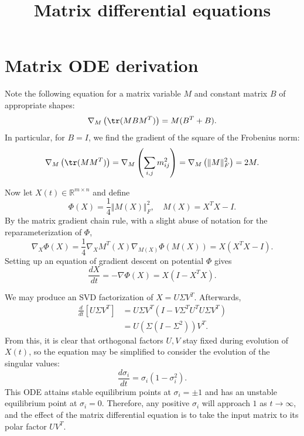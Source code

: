 \documentclass[12pt]{article}
\title{Matrix differential equations}
\begin{document}
\maketitle
\appendix

\section{Matrix ODE derivation}
Note the following equation for a matrix variable $M$ and constant matrix $B$ of appropriate shapes:
\begin{equation*}
	\nabla_M\left(\tr(M B M^T)\right) = M(B^T + B).
\end{equation*}
In particular, for $B=I$, we find the gradient of the square of the Frobenius norm:
\begin{equation*}
	\nabla_M\left(\tr(M M^T)\right) = \nabla_M\left(\sum_{i,j} m_{ij}^2\right) = \nabla_M\left(\Vert M\Vert_F^2\right) = 2M.
\end{equation*}

Now let $X(t) \in \mathbb{R}^{m \times n}$ and define
\begin{equation*}
	\Phi(X) = \frac{1}{4} \Vert M(X) \Vert^2_F, \quad M(X) = X^T X - I.
\end{equation*}
By the matrix gradient chain rule, with a slight abuse of notation for the reparameterization of $\Phi$,
\begin{equation*}
	\nabla_X\Phi(X) = \frac{1}{4} \nabla_X M^T(X) \nabla_{M(X)} \Phi\left(M(X)\right) = X (X^T X - I).
\end{equation*}
Setting up an equation of gradient descent on potential $\Phi$ gives
\begin{equation*}
    \frac{dX}{dt} = -\nabla\Phi(X) = X(I - X^T X).
\end{equation*}

We may produce an SVD factorization of $X = U \Sigma V^T.$ Afterwards,
\begin{align*}
    \frac{d}{dt}\left[U \Sigma V^T\right]
        &= U \Sigma V^T (I - V \Sigma^T U^T U \Sigma V^T) \\
        &= U \left( \Sigma \left( I - \Sigma^2 \right) \right) V^T.
\end{align*}
From this, it is clear that orthogonal factors $U, V$ stay fixed during evolution of $X(t)$, so the equation may be simplified to consider the evolution of the singular values:
\begin{equation*}
    \frac{d\sigma_i}{dt} = \sigma_i(1 - \sigma_i^2).
\end{equation*}
This ODE attains stable equilibrium points at $\sigma_i = \pm1$ and has an unstable equilibrium point at $\sigma_i = 0$. Therefore, any positive $\sigma_i$ will approach $1$ as $t\rightarrow\infty$, and the effect of the matrix differential equation is to take the input matrix to its polar factor $U V^T$.
\end{document}
